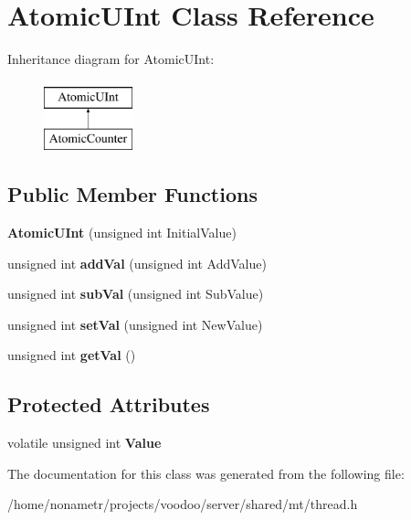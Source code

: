 \hypertarget{classAtomicUInt}{\section{\-Atomic\-U\-Int \-Class \-Reference}
\label{classAtomicUInt}
}
\-Inheritance diagram for \-Atomic\-U\-Int\-:\begin{figure}[H]
\begin{center}
\leavevmode
\includegraphics[height=2.000000cm]{classAtomicUInt}
\end{center}
\end{figure}
\subsection*{\-Public \-Member \-Functions}
\begin{DoxyCompactItemize}
\item 
\hypertarget{classAtomicUInt_a65bd3ad3493bd2f2797db73aacce9882}{{\bfseries \-Atomic\-U\-Int} (unsigned int \-Initial\-Value)}\label{classAtomicUInt_a65bd3ad3493bd2f2797db73aacce9882}

\item 
\hypertarget{classAtomicUInt_ae82f87c778d1fd9e67fb1f775f1dd57c}{unsigned int {\bfseries add\-Val} (unsigned int \-Add\-Value)}\label{classAtomicUInt_ae82f87c778d1fd9e67fb1f775f1dd57c}

\item 
\hypertarget{classAtomicUInt_a18db8edb0b877d5a8318c14396821b17}{unsigned int {\bfseries sub\-Val} (unsigned int \-Sub\-Value)}\label{classAtomicUInt_a18db8edb0b877d5a8318c14396821b17}

\item 
\hypertarget{classAtomicUInt_a6c87f086b485602617626075cd93f195}{unsigned int {\bfseries set\-Val} (unsigned int \-New\-Value)}\label{classAtomicUInt_a6c87f086b485602617626075cd93f195}

\item 
\hypertarget{classAtomicUInt_ab63ca35550efe69346e79b52c4670125}{unsigned int {\bfseries get\-Val} ()}\label{classAtomicUInt_ab63ca35550efe69346e79b52c4670125}

\end{DoxyCompactItemize}
\subsection*{\-Protected \-Attributes}
\begin{DoxyCompactItemize}
\item 
\hypertarget{classAtomicUInt_aba7c56a82dffafaa622adfe4ec09d2ca}{volatile unsigned int {\bfseries \-Value}}\label{classAtomicUInt_aba7c56a82dffafaa622adfe4ec09d2ca}

\end{DoxyCompactItemize}


\-The documentation for this class was generated from the following file\-:\begin{DoxyCompactItemize}
\item 
/home/nonametr/projects/voodoo/server/shared/mt/thread.\-h\end{DoxyCompactItemize}
